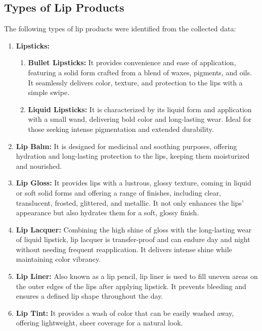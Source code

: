 \documentclass{article}
\begin{document}
\subsection{Types of Lip Products}
The following types of lip products were identified from the collected data:
\begin{enumerate}
    \item \textbf{Lipsticks:} \begin{enumerate}
              \item \textbf{Bullet Lipsticks:} It provides convenience and ease of application, featuring a solid form crafted from a blend of waxes, pigments, and oils. It seamlessly delivers color, texture, and protection to the lips with a simple swipe.

              \item \textbf{Liquid Lipsticks:} It is characterized by its liquid form and application with a small wand, delivering bold color and long-lasting wear. Ideal for those seeking intense pigmentation and extended durability.
          \end{enumerate}

    \item \textbf{Lip Balm:} It is designed for medicinal and soothing purposes, offering hydration and long-lasting protection to the lips, keeping them moisturized and nourished.

    \item \textbf{Lip Gloss:} It provides lips with a lustrous, glossy texture, coming in liquid or soft solid forms and offering a range of finishes, including clear, translucent, frosted, glittered, and metallic. It not only enhances the lips' appearance but also hydrates them for a soft, glossy finish.

    \item \textbf{Lip Lacquer:} Combining the high shine of gloss with the long-lasting wear of liquid lipstick, lip lacquer is transfer-proof and can endure day and night without needing frequent reapplication. It delivers intense shine while maintaining color vibrancy.

    \item \textbf{Lip Liner:} Also known as a lip pencil, lip liner is used to fill uneven areas on the outer edges of the lips after applying lipstick. It prevents bleeding and ensures a defined lip shape throughout the day.

    \item \textbf{Lip Tint:} It provides a wash of color that can be easily washed away, offering lightweight, sheer coverage for a natural look.


\end{enumerate}
\end{document}
